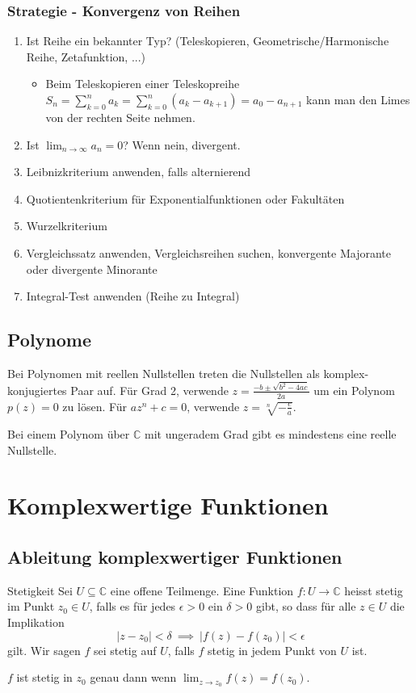 \documentclass[a4paper,10pt]{article}
\def\limn{\lim_{n\to \infty}}
\begin{document}
\subsubsection{Strategie - Konvergenz von Reihen}
\begin{enumerate}
 \item Ist Reihe ein bekannter Typ? (Teleskopieren, Geometrische/Harmonische Reihe, Zetafunktion, ...){
  \begin{itemize}
    \item Beim Teleskopieren einer Teleskopreihe $S_n = \sum_{k=0}^n a_k = \sum_{k=0}^n (a_k - a_{k+1}) = a_0 - a_{n+1}$ kann man den Limes von der rechten Seite nehmen.
  \end{itemize}
 }
 \item Ist $\limn a_n = 0$? Wenn nein, divergent.
 \item Leibnizkriterium anwenden, falls alternierend
 \item Quotientenkriterium für Exponentialfunktionen oder Fakultäten
 \item Wurzelkriterium
 \item Vergleichssatz anwenden, Vergleichsreihen suchen, konvergente Majorante oder divergente Minorante
 \item Integral-Test anwenden (Reihe zu Integral)
\end{enumerate}


\subsection{Polynome}

Bei Polynomen mit reellen Nullstellen treten die Nullstellen als komplex-konjugiertes Paar auf. Für Grad 2, verwende $z = \frac{-b \pm \sqrt{b^2 - 4ac}}{2a}$ um ein Polynom $p(z) = 0$ zu lösen. Für $a z^n + c = 0$, verwende $z = \sqrt[n]{-\frac{c}{a}}$.

Bei einem Polynom über $\mathbb{C}$ mit ungeradem Grad gibt es mindestens eine reelle Nullstelle.

\section{Komplexwertige Funktionen}

\subsection{Ableitung komplexwertiger Funktionen}

\begin{subbox}{Stetigkeit}
  Sei \(U\subseteq\mathbb{C}\) eine offene Teilmenge. Eine Funktion \(f\colon U\to\mathbb{C}\) heisst stetig im Punkt \(z_0\in U\), falls es für jedes \(\epsilon>0\) ein \(\delta >0\) gibt, so dass für alle \(z\in U\) die Implikation \[|z-z_0|<\delta ~\implies ~ |f(z)-f(z_0)|< \epsilon\] gilt. Wir sagen \(f\) sei stetig auf \(U\), falls \(f\) stetig in jedem Punkt von \(U\) ist.

  $f$ ist stetig in $z_0$ genau dann wenn $\lim_{z \to z_0} f(z) = f(z_0)$.
\end{subbox}
\end{document}
